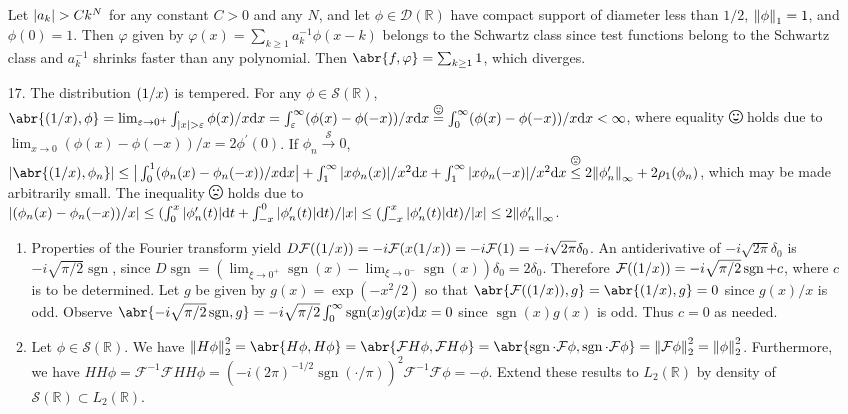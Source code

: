 \documentclass[11pt,leqno]{article}
\theoremstyle{plain}
\theoremstyle{definition}
\numberwithin{equation}{section}
\numberwithin{lem}{section}
\newcommand{\eq}[1]{\overset{#1}{=}}
\let\PV\relax
\DeclareMathOperator{\PV}{PV}
\DeclareMathOperator{\sgn}{sgn}
\newcommand{\smallhappy}{\smiley}
\newcommand{\happy}{\raisebox{-.14em}{\resizebox{1.2em}{!}{\smiley}}}
\newcommand{\smallsad}{\frownie}
\newcommand{\sad}{\raisebox{-.14em}{\resizebox{1.2em}{!}{\frownie}}}
\DeclareMathOperator{\mathhappy}{\!\happy\!}
\DeclareMathOperator{\smallmathhappy}{\!\smallhappy\!}
\DeclareMathOperator{\mathsad}{\!\sad\!}
\DeclareMathOperator{\smallmathsad}{\!\smallsad\!}
\newcommand{\lqq}[1]{\overset{#1}{\leq}}
\begin{document}
\begin{enumerate}
    Let $\abs{a_k}>Ck^N$ for any constant $C>0$ and any $N$, and let $\phi\in \mathcal D(\mathbb R)$ have compact support of diameter less than $1/2$, $\norm{\phi}_1 = 1$, and $\phi(0) = 1$. Then $\varphi$ given by $\varphi(x) = \sum_{k\geq 1}a_k^{-1}\phi(x-k)$ belongs to the Schwartz class since test functions belong to the Schwartz class and $a_k^{-1}$ shrinks faster than any polynomial. Then $\abr{f,\varphi} = \sum_{k\geq 1}1$, which diverges.
    \item[17.] The distribution $\PV(1/x)$ is tempered. For any $\phi\in\mathcal S(\mathbb R)$, $\abr{\PV(1/x),\phi} = \lim_{\varepsilon\to 0^+}\int_{\abs{x}>\varepsilon}\phi(x)/x\dd x = \int_\varepsilon^\infty(\phi(x)-\phi(-x))/x\dd x \eq{\smallmathhappy}\int_0^\infty (\phi(x)-\phi(-x))/x\dd x < \infty$, where equality $\mathhappy$ holds due to $\lim_{x\to 0}(\phi(x)-\phi(-x))/x = 2\phi^\prime(0)$.
    \sloppy If $\phi_n\xrightarrow{\mathcal S}0$, $\abs{\abr{\PV(1/x),\phi_n}}\leq \big|\int_0^1(\phi_n(x)-\phi_n(-x))/x\dd x\big| + \int_1^\infty \abs{x\phi_n(x)}/x^2\dd x + \int_1^\infty\abs{x\phi_n(-x)}/x^2\dd x\lqq{\smallmathsad} 2\norm{\phi_n^\prime}_\infty + 2\rho_1(\phi_n)$, which may be made arbitrarily small. The inequality $\mathsad$ holds due to $\abs{(\phi_n(x)-\phi_n(-x))/x}\leq (\int_0^x\abs{\phi_n^\prime(t)}\dd t + \int_{-x}^0\abs{\phi_n^\prime(t)}\dd t)/\abs{x}\leq (\int_{-x}^x\abs{\phi_n^\prime(t)}\dd t)/\abs{x}\leq 2\norm{\phi_n^\prime}_\infty$. \begin{enumerate}
        \item Properties of the Fourier transform yield $D\mathcal F(\PV(1/x))= -i\mathcal F(x\PV(1/x)) = -i\mathcal F(1) = -i\sqrt{2\pi}\delta_0$. An antiderivative of $-i\sqrt{2\pi}\delta_0$ is $-i\sqrt{\pi/2}\sgn$, since $D\sgn = (\lim_{\xi\to 0^+}\sgn(x) - \lim_{\xi\to 0^-}\sgn(x))\delta_0 = 2\delta_0$. Therefore $\mathcal F(\PV(1/x)) = -i\sqrt{\pi/2}\sgn + c$, where $c$ is to be determined. Let $g$ be given by $g(x) = \exp(-x^2/2)$ so that $\abr{\mathcal F(\PV(1/x)),g} = \abr{\PV(1/x),g} = 0$ since $g(x)/x$ is odd. Observe $\abr{-i\sqrt{\pi/2}\sgn,g}= -i\sqrt{\pi/2}\int_0^\infty \sgn(x)g(x)\dd x = 0$ since $\sgn(x)g(x)$ is odd. Thus $c = 0$ as needed.
        \item Let $\phi\in \mathcal S(\mathbb R)$. We have $\norm{H\phi}_2^2 = \abr{H\phi,H\phi} = \abr{\mathcal FH\phi,\mathcal FH\phi} = \abr{\sgn\cdot\mathcal F\phi,\sgn\cdot\mathcal F\phi} = \norm{\mathcal F\phi}_2^2 = \norm{\phi}_2^2$. Furthermore, we have $HH\phi = \mathcal F^{-1}\mathcal FHH\phi = (-i(2\pi)^{-1/2}\sgn(\cdot/\pi))^2\mathcal F^{-1}\mathcal F\phi = -\phi$. Extend these results to $L_2(\mathbb R)$ by density of $\mathcal S(\mathbb R)\subset L_2(\mathbb R)$.

\end{enumerate}
\end{enumerate}
\end{document}
